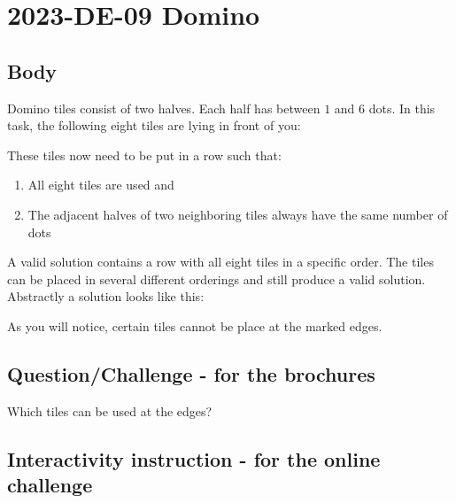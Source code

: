 \documentclass[a4paper,11pt]{report}
\newcommand{\taskGraphicsFolder}{..}
\begin{document}
\section*{\centering{} 2023-DE-09 Domino}


\subsection*{Body}

Domino tiles consist of two halves. Each half has between $1$ and $6$ dots. In this task, the following eight tiles are lying in front of you:

{\centering%
\par}

These tiles now need to be put in a row such that:

\begin{enumerate}
  \item All eight tiles are used and
  \item The adjacent halves of two neighboring tiles always have the same number of dots
\end{enumerate}

{\centering%
\par}

A valid solution contains a row with all eight tiles in a specific order. The tiles can be placed in several different orderings and still produce a valid solution. Abstractly a solution looks like this:

{\centering%
\par}

As you will notice, certain tiles cannot be place at the marked edges.

{\em


\subsection*{Question/Challenge - for the brochures}

Which tiles can be used at the edges?

}


\subsection*{Interactivity instruction - for the online challenge}
\end{document}
